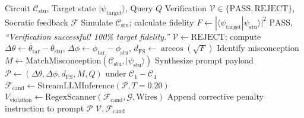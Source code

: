 \documentclass[conference]{IEEEtran}
\begin{document}
\vspace{1pt}
\noindent{}
\vspace{1pt}

\begin{algorithm}[t]
\caption{Schr{\"o}dinger AI Socratic Guidance \& Guardrail Loop}
\label{alg:socratic}
\footnotesize
\begin{algorithmic}[1]
\REQUIRE Circuit $\mathcal{C}_{\text{stu}}$, Target state $|\psi_{\text{target}}\rangle$, Query $Q$
\ENSURE Verification $\mathcal{V} \in \{\text{PASS}, \text{REJECT}\}$, Socratic feedback $\mathcal{F}$
\STATE Simulate $\mathcal{C}_{\text{stu}}$; calculate fidelity $F \leftarrow |\langle \psi_{\text{target}} | \psi_{\text{stu}} \rangle|^2$
    \RETURN $\text{PASS}$, \textit{``Verification successful! 100\% target fidelity.''}
\ENDIF
\STATE $\mathcal{V} \leftarrow \text{REJECT}$; compute $\Delta\theta \leftarrow \theta_{\text{tar}} - \theta_{\text{stu}}$, $\Delta\phi \leftarrow \phi_{\text{tar}} - \phi_{\text{stu}}$, $d_{\text{FS}} \leftarrow \arccos(\sqrt{F})$
\STATE Identify misconception $M \leftarrow \text{MatchMisconception}(\mathcal{C}_{\text{stu}}, |\psi_{\text{stu}}\rangle)$
\STATE Synthesize prompt payload $\mathcal{P} \leftarrow (\Delta\theta, \Delta\phi, d_{\text{FS}}, M, Q)$ under $\mathcal{C}_1-\mathcal{C}_4$
\REPEAT
    \STATE $\mathcal{F}_{\text{cand}} \leftarrow \text{StreamLLMInference}(\mathcal{P}, T=0.20)$
    \STATE $V_{\text{violation}} \leftarrow \text{RegexScanner}(\mathcal{F}_{\text{cand}}, \mathcal{G}, \text{Wires})$
        \STATE Append corrective penalty instruction to prompt $\mathcal{P}$
    \ENDIF
{}
\RETURN $\mathcal{V}, \mathcal{F}_{\text{cand}}$
\end{algorithmic}
\end{algorithm}
\end{document}
